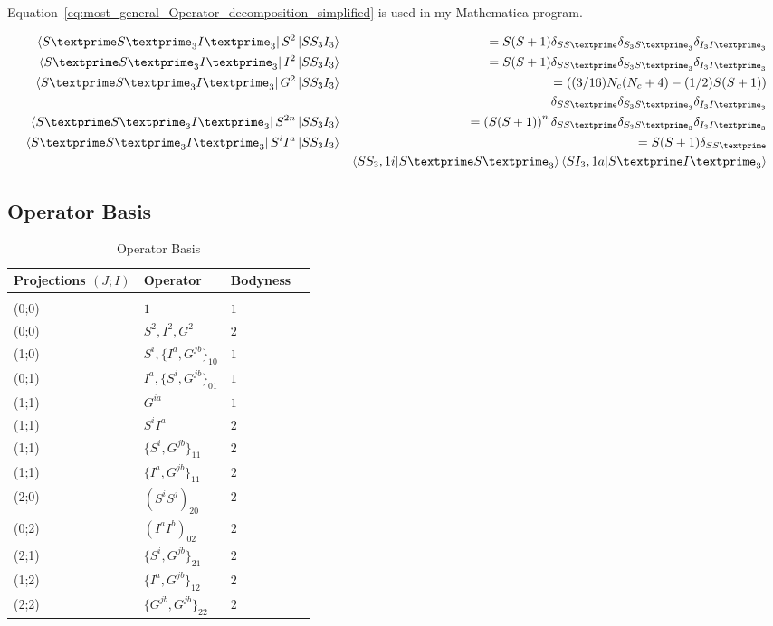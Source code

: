 \documentclass{article}
\newcommand{\bea}{\begin{eqnarray}}
\newcommand{\eea}{\end{eqnarray}}
\newcommand{\pr}{\textprime}
\begin{document}
Equation~\ref{eq:most_general_Operator_decomposition_simplified} is used in my Mathematica program. 

\newpage

\bea 
\bra{S\pr S\pr_3 I\pr_3} S^2 \ket{S S_3 I_3} &&= S(S+1)  \delta_{SS\pr}\delta_{S_3S\pr_3} \delta_{I_3I\pr_3}  \\
\bra{S\pr S\pr_3 I\pr_3} I^2 \ket{S S_3 I_3} &&= S(S+1)  \delta_{SS\pr}\delta_{S_3S\pr_3} \delta_{I_3I\pr_3}  \\
\bra{S\pr S\pr_3 I\pr_3} G^2 \ket{S S_3 I_3} &&=\left((3/16)N_c(N_c+4)-(1/2)S(S+1)\right) \nonumber \\
&& \delta_{SS\pr}\delta_{S_3S\pr_3} \delta_{I_3I\pr_3}  \\
\bra{S\pr S\pr_3 I\pr_3} S^{2n} \ket{S S_3 I_3} &&= \left( S(S+1) \right)^n  \delta_{SS\pr}\delta_{S_3S\pr_3}\delta_{I_3I\pr_3}\\
\bra{S\pr S\pr_3 I\pr_3} S^i I^a \ket{S S_3 I_3}&& = S(S+1)  \delta_{SS\pr}  \nonumber \\
&& \bra{S S_3, 1 i} \ket{S\pr S\pr_3} \bra{S I_3, 1 a} \ket{S\pr I\pr_3}  
\eea

\subsection{Operator Basis}

\begin{table}
	[ht]
	\centering
	\caption{Operator Basis}\label{table:Operator_Basis} 
	\begin{tabular}{ M{3cm} M{1.5cm} M{4.5cm} M{2cm}}
		\hline 
		Projections $(J;I)$ & Operator& Bodyness\\
		\hline 
		\\
		(0;0) & $ 1 $&   $ 1 $  \\ 
		(0;0) & $ S^2 ,I^2,  G^2 $ &  $ 2 $  \\  
		(1;0) & $ S^i , \{I^a,G^{jb}\}_{10}$ &  $ 1 $  \\ 
		(0;1) & $ I^a , \{S^i,G^{jb}\}_{01}$&   $ 1 $  \\ 
		(1;1) & $ G^{ia} $&   $ 1 $  \\  
		(1;1) & $ S^iI^a $&   $ 2 $  \\ 
		(1;1) & $ \{S^i,G^{jb}\}_{11} $&   $ 2 $  \\
		(1;1) & $ \{I^a,G^{jb}\}_{11} $&   $ 2 $  \\  
		(2;0) & $ (S^iS^j)_{20} $&  $ 2 $  \\ 
		(0;2) & $ (I^aI^b)_{02} $&   $ 2 $  \\ 
		(2;1) & $ \{S^i,G^{jb}\}_{21} $&   $ 2 $  \\  
		(1;2) & $ \{I^a,G^{jb}\}_{12} $&   $ 2 $  \\  
		(2;2) & $ \{G^{jb},G^{jb}\}_{22} $&   $ 2 $  \\ 
		\hline
	\end{tabular}
\end{table}
\end{document}
